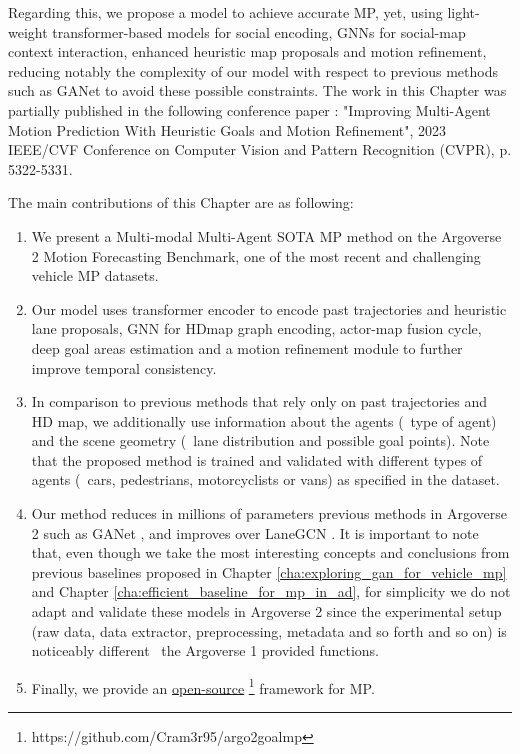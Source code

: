Regarding this, we propose a model to achieve accurate \ac{MP}, yet, using light-weight transformer-based models for social encoding, \acp{GNN} for social-map context interaction, enhanced heuristic map proposals and motion refinement, reducing notably the complexity of our model with respect to previous methods such as GANet \cite{wang2022ganet} to avoid these possible constraints. The work in this Chapter was partially published in the following conference paper \cite{gomez2023improving}: "Improving Multi-Agent Motion Prediction With Heuristic Goals and Motion Refinement", 2023 IEEE/CVF Conference on Computer Vision and Pattern Recognition (CVPR), p. 5322-5331. 

The main contributions of this Chapter are as following: 

\begin{enumerate}
	
	\item We present a Multi-modal Multi-Agent \ac{SOTA} \ac{MP} method on the Argoverse 2 Motion Forecasting Benchmark, one of the most recent and challenging vehicle \ac{MP} datasets.
	
	\item Our model uses transformer encoder to encode past trajectories and heuristic lane proposals, \ac{GNN} for \ac{HDmap} graph encoding, actor-map fusion cycle, deep goal areas estimation and a motion refinement module to further improve temporal consistency.
	
	\item In comparison to previous methods that rely only on past trajectories and HD map, we additionally use information about the agents (\eg \ type of agent) and the scene geometry (\eg \ lane distribution and possible goal points). Note that the proposed method is trained and validated with different types of agents (\eg \ cars, pedestrians, motorcyclists or vans) as specified in the dataset.
	
	\item Our method reduces in millions of parameters previous methods in Argoverse 2 such as GANet \cite{wang2022ganet}, and improves over LaneGCN \cite{liang2020learning}. It is important to note that, even though we take the most interesting concepts and conclusions from previous baselines proposed in Chapter \ref{cha:exploring_gan_for_vehicle_mp} and Chapter \ref{cha:efficient_baseline_for_mp_in_ad}, for simplicity we do not adapt and validate these models in Argoverse 2 since the experimental setup (raw data, data extractor, preprocessing, metadata and so forth and so on) is noticeably different \wrt \ the Argoverse 1 provided functions.
	
	\item Finally, we provide an \href{https://github.com/Cram3r95/argo2goalmp}{open-source} \footnote{https://github.com/Cram3r95/argo2goalmp} framework for \ac{MP}.
	
\end{enumerate}

